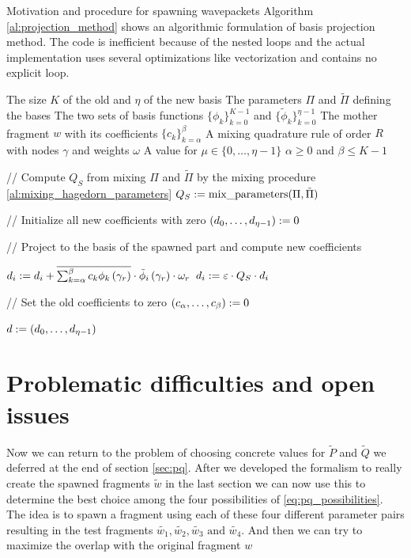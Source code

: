 \begin{chapter}{Motivation and procedure for spawning wavepackets}
Algorithm \ref{al:projection_method} shows an algorithmic formulation of basis
projection method. The code is inefficient because of the nested loops and the
actual implementation uses several optimizations like vectorization and contains
no explicit loop.

\begin{algorithm}
\caption{Basis projection method for the change of basis}
\label{al:projection_method}
\begin{algorithmic}
  \REQUIRE The size $K$ of the old and $\eta$ of the new basis
  \REQUIRE The parameters $\Pi$ and $\tilde{\Pi}$ defining the bases
  \REQUIRE The two sets of basis functions $\{\phi_k\}_{k=0}^{K-1}$ and $\{\tilde{\phi}_k\}_{k=0}^{\eta-1}$
  \REQUIRE The mother fragment $w$ with its coefficients $\{c_k\}_{k=\alpha}^{\beta}$
  \REQUIRE A mixing quadrature rule of order $R$ with nodes $\gamma$ and weights $\omega$
  \REQUIRE A value for $\mu \in \{0, \ldots, \eta-1\}$
  \REQUIRE $\alpha \geq 0$ and $\beta \leq K-1$

  \STATE // Compute $Q_S$ from mixing $\Pi$ and $\tilde{\Pi}$ by the mixing procedure \ref{al:mixing_hagedorn_parameters}
  \STATE $Q_S := \text{mix\_parameters}(\Pi, \tilde{\Pi})$

  \STATE // Initialize all new coefficients with zero
  \STATE $\left(d_0, \ldots, d_{\eta-1}\right) := 0$

  \STATE // Project to the basis of the spawned part and compute new coefficients

      \STATE $d_i := d_i + \overline{  \sum_{k=\alpha}^\beta c_k \phi_k\left( \gamma_r \right)} \cdot \tilde{\phi}_i \left( \gamma_r \right) \cdot \omega_r$
    \ENDFOR
    \STATE $d_i := \varepsilon \cdot Q_S \cdot d_i$
  \ENDFOR

  \STATE // Set the old coefficients to zero
  \STATE $\left(c_\alpha, \ldots, c_\beta\right) := 0$

  \RETURN $d := \left(d_0, \ldots, d_{\eta-1}\right)$
\end{algorithmic}
\end{algorithm}


\section{Problematic difficulties and open issues}

Now we can return to the problem of choosing concrete values for $\tilde{P}$ and $\tilde{Q}$
we deferred at the end of section \ref{sec:pq}. After we developed the formalism
to really create the spawned fragments $\tilde{w}$ in the last section we can
now use this to determine the best choice among the four possibilities of \eqref{eq:pq_possibilities}.
The idea is to spawn a fragment using each of these four different parameter pairs
resulting in the test fragments $\tilde{w_1}, \tilde{w_2}, \tilde{w_3} \text{ and } \tilde{w_4}$.
And then we can try to maximize the overlap with the original fragment $w$


\end{chapter}
